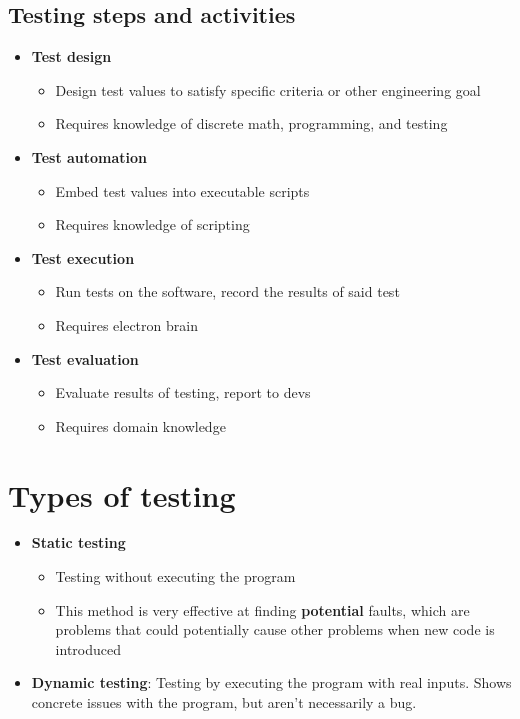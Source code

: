 \documentclass[12pt]{book}
\begin{document}
\subsection*{Testing steps and activities}
\begin{itemize}
  \item \textbf{Test design}
  \begin{itemize}
    \item Design test values to satisfy specific criteria or other engineering goal
    \item Requires knowledge of discrete math, programming, and testing
  \end{itemize}

  \item \textbf{Test automation}
  \begin{itemize}
    \item Embed test values into executable scripts
    \item Requires knowledge of scripting
  \end{itemize}

  \item \textbf{Test execution}
  \begin{itemize}
    \item Run tests on the software, record the results of said test
    \item Requires electron brain
  \end{itemize}
  
  \item \textbf{Test evaluation}
  \begin{itemize}
    \item Evaluate results of testing, report to devs
    \item Requires domain knowledge
  \end{itemize} 
\end{itemize}

\section*{Types of testing}
\begin{itemize}
  \item \textbf{Static testing}
  \begin{itemize}
    \item Testing without executing the program
    \item This method is very effective at finding \textbf{potential} faults, which are problems that could potentially cause other problems when new code is introduced
  \end{itemize} 

  \item \textbf{Dynamic testing}: Testing by executing the program with real inputs. Shows concrete issues with the program, but aren't necessarily a bug.
\end{itemize}
\end{document}
